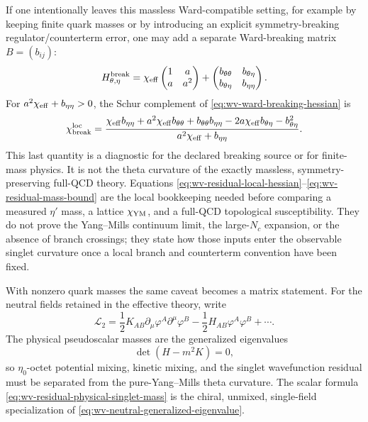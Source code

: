 \begin{controlledapproximation}
If one intentionally leaves this massless Ward-compatible setting, for example
by keeping finite quark masses or by introducing an explicit symmetry-breaking
regulator/counterterm error, one may add a separate Ward-breaking matrix
\(B=(b_{ij})\):
\begin{equation}
  H_{\theta,\eta}^{\rm break}
  =
  \chi_{\rm eff}
  \begin{pmatrix}1&a\\a&a^2\end{pmatrix}
  +
  \begin{pmatrix}
    b_{\theta\theta}&b_{\theta\eta}\\
    b_{\theta\eta}&b_{\eta\eta}
  \end{pmatrix}.
  \label{eq:wv-ward-breaking-hessian}
\end{equation}
For \(a^2\chi_{\rm eff}+b_{\eta\eta}>0\), the Schur complement of
\eqref{eq:wv-ward-breaking-hessian} is
\begin{equation}
  \chi_{\rm break}^{\rm loc}
  =
  \frac{
    \chi_{\rm eff}b_{\eta\eta}
    +a^2\chi_{\rm eff}b_{\theta\theta}
    +b_{\theta\theta}b_{\eta\eta}
    -2a\chi_{\rm eff}b_{\theta\eta}
    -b_{\theta\eta}^2}
  {a^2\chi_{\rm eff}+b_{\eta\eta}} .
  \label{eq:wv-ward-breaking-schur-diagnostic}
\end{equation}
This last quantity is a diagnostic for the declared breaking source or for
finite-mass physics.  It is not the theta curvature of the exactly massless,
symmetry-preserving full-QCD theory.  Equations
\eqref{eq:wv-residual-local-hessian}--\eqref{eq:wv-residual-mass-bound} are the
local bookkeeping needed before comparing a measured \(\eta'\) mass, a lattice
\(\chi_{\rm YM}\), and a full-QCD topological susceptibility.  They do not
prove the Yang--Mills continuum limit, the large-\(N_c\) expansion, or the
absence of branch crossings; they state how those inputs enter the observable
singlet curvature once a local branch and counterterm convention have been
fixed.

With nonzero quark masses the same caveat becomes a matrix statement.  For the
neutral fields retained in the effective theory, write
\[
  \mathcal L_2
  =
  \frac12 K_{AB}\partial_\mu\varphi^A\partial^\mu\varphi^B
  -\frac12 H_{AB}\varphi^A\varphi^B+\cdots .
\]
The physical pseudoscalar masses are the generalized eigenvalues
\begin{equation}
  \det(H-m^2K)=0 ,
  \label{eq:wv-neutral-generalized-eigenvalue}
\end{equation}
so \(\eta_0\)-octet potential mixing, kinetic mixing, and the singlet
wavefunction residual must be separated from the pure-Yang--Mills theta
curvature.  The scalar formula
\eqref{eq:wv-residual-physical-singlet-mass} is the chiral, unmixed,
single-field specialization of \eqref{eq:wv-neutral-generalized-eigenvalue}.
\end{controlledapproximation}

